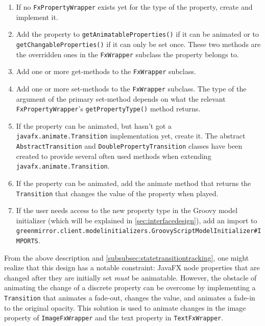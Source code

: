 \documentclass[a4paper]{article}
\begin{document}
\begin{enumerate}
\item If no \lstinline{FxPropertyWrapper} exists yet for the type of the property, create and implement it.
\item Add the property to \lstinline{getAnimatableProperties()} if it can be animated or to \lstinline{getChangableProperties()} if it can only be set once. These two methods are the overridden ones in the \lstinline{FxWrapper} subclass the property belongs to.
\item Add one or more get-methods to the \lstinline{FxWrapper} subclass.
\item Add one or more set-methods to the \lstinline{FxWrapper} subclass. The type of the argument of the primary set-method depends on what the relevant \lstinline{FxPropertyWrapper}'s \lstinline{getPropertyType()} method returns.
\item If the property can be animated, but hasn't got a \lstinline{javafx.animate.Transition} implementation yet, create it. The abstract \lstinline{AbstractTransition} and \lstinline{DoublePropertyTransition} classes have been created to provide several often used methods when extending \lstinline{javafx.animate.Transition}.
\item If the property can be animated, add the animate method that returns the \lstinline{Transition} that changes the value of the property when played.
\item If the user needs access to the new property type in the Groovy model initializer (which will be explained in \cref{sec:interfacedesign}), add an import to\\ \lstinline{greenmirror.client.modelinitializers.GroovyScriptModelInitializer#IMPORTS}.
\end{enumerate}

From the above description and \cref{subsubsec:statetransitiontracking}, one might realize that this design has a notable constraint: JavaFX node properties that are changed after they are initially set \emph{must} be animatable. However, the obstacle of animating the change of a discrete property can be overcome by implementing  a \lstinline{Transition} that animates a fade-out, changes the value, and animates a fade-in to the original opacity. This solution is used to animate changes in the image property of \lstinline{ImageFxWrapper} and the text property in \lstinline{TextFxWrapper}.
\end{document}
